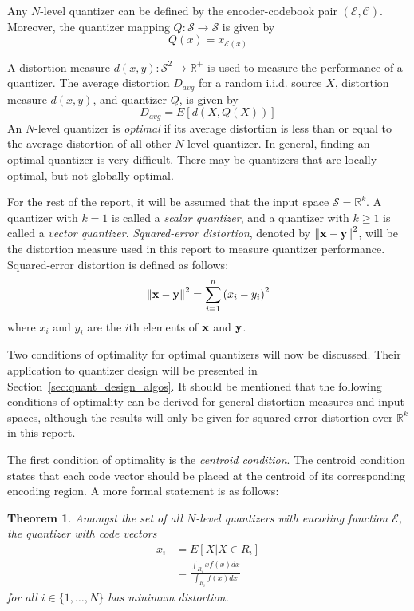 \documentclass[10pt]{article}
\newtheorem{theorem}{Theorem}[section]
\begin{document}
Any $N$-level quantizer can be defined by the encoder-codebook pair $(\mathcal{E}, \mathcal{C})$. Moreover, the quantizer mapping $Q : \mathcal{S} \rightarrow \mathcal{S}$ is given by
\begin{equation}
Q(x) = x_{\mathcal{E}(x)}
\end{equation}

A distortion measure $d(x,y) : \mathcal{S}^2 \rightarrow \mathbb{R}^+$ is used to measure the performance of a quantizer. The average distortion $D_{avg}$ for a random i.i.d. source $X$, distortion measure $d(x,y)$, and quantizer $Q$, is given by
\begin{equation}
  \label{eq:D_avg}
D_{avg} = E[d(X,Q(X))]
\end{equation}
An $N$-level quantizer is \emph{optimal} if its average distortion is less than or equal to the average distortion of all other $N$-level quantizer. In general, finding an optimal quantizer is very difficult. There may be quantizers that are locally optimal, but not globally optimal.

For the rest of the report, it will be assumed that the input space $\mathcal{S}=\mathbb{R}^k$. A quantizer with $k=1$ is called a \emph{scalar quantizer}, and a quantizer with $k \ge 1$ is called a \emph{vector quantizer}. \emph{Squared-error distortion}, denoted by ${\bf {\| x - y \|}}^2$, will be the distortion measure used in this report to measure quantizer performance. Squared-error distortion is defined as follows:
\begin{equation}
{\bf {\| x - y \|}}^2 = \sum_{i=1}^n{(x_i - y_i)}^2
\end{equation}
where $x_i$ and $y_i$ are the $i$th elements of $\bf x$ and $\bf y$.

Two conditions of optimality for optimal quantizers will now be discussed. Their application to quantizer design will be presented in Section~\ref{sec:quant_design_algos}. It should be mentioned that the following conditions of optimality can be derived for general distortion measures and input spaces, although the results will only be given for squared-error distortion over $\mathbb{R}^k$ in this report.

The first condition of optimality is the \emph{centroid condition}. The centroid condition states that each code vector should be placed at the centroid of its corresponding encoding region. A more formal statement is as follows:

\begin{theorem}
\label{theo:cent_vq}
Amongst the set of all $N$-level quantizers with encoding function $\mathcal{E}$, the quantizer with code vectors
\begin{align}
  \label{eq:cent_vq}
x_i &= E[X | X \in R_i] \\
&= \frac{ \int_{R_i}xf(x)dx }{ \int_{R_i}f(x)dx }
\end{align}
for all $i \in \{1,\ldots,N\}$ has minimum distortion.
\end{theorem}
\end{document}
